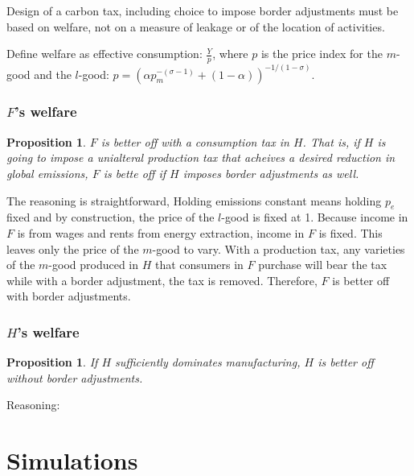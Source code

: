 \documentclass[notitlepage,12pt]{article}
\newtheorem{proposition}[theorem]{Proposition}
\begin{document}
Design of a carbon tax, including choice to impose border adjustments must
be based on welfare, not on a measure of leakage or of the location of
activities.

Define welfare as effective consumption: $\frac{Y}{p}$, where $p$ is the
price index for the $m$-good and the $l$-good: $p=\left( \alpha
p_{m}^{-\left( \sigma -1\right) }+\left( 1-\alpha \right) \right)
^{-1/\left( 1-\sigma \right) }$.

\subsubsection{$F$'s welfare}

\begin{proposition}
$F$ is better off with a consumption tax in $H$. That is, if $H$ is going to
impose a unialteral production tax that acheives a desired reduction in
global emissions, $F$ is bette off if $H$ imposes border adjustments as well.
\end{proposition}

The reasoning is straightforward, Holding emissions constant means holding $%
p_{e}$ fixed and by construction, the price of the $l$-good is fixed at 1.
Because income in $F$ is from wages and rents from energy extraction, income
in $F$ is fixed. This leaves only the price of the $m$-good to vary. With a
production tax, any varieties of the $m$-good produced in $H$ that consumers
in $F$ purchase will bear the tax while with a border adjustment, the tax is
removed. Therefore, $F$ is better off with border adjustments.

\subsubsection{$H$'s welfare}

\begin{proposition}
If $H$ sufficiently dominates manufacturing, $H$ is better off without
border adjustments.
\end{proposition}

Reasoning:

\section{Simulations}
\end{document}
